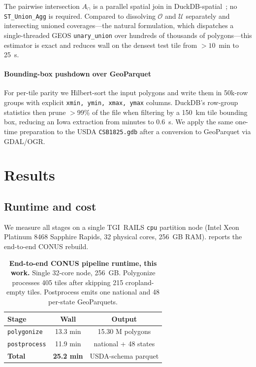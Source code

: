 \documentclass[preprint,12pt]{elsarticle}
\begin{document}
The pairwise intersection $A_\cap$ is a parallel spatial join in
DuckDB-spatial~\cite{duckdbspatial}; no \texttt{ST\_Union\_Agg} is
required. Compared to dissolving $\mathcal{O}$ and $\mathcal{U}$
separately and intersecting unioned coverages---the natural
formulation, which dispatches a single-threaded GEOS
\texttt{unary\_union} over hundreds of thousands of polygons---this
estimator is exact and reduces wall on the densest test tile from
$>10$~min to 25~s.

\paragraph{Bounding-box pushdown over GeoParquet}
For per-tile parity we Hilbert-sort the input polygons and write them
in 50k-row groups with explicit \texttt{xmin, ymin, xmax, ymax}
columns. DuckDB's row-group statistics then prune $>$99\% of the file
when filtering by a 150~km tile bounding box, reducing an Iowa
extraction from minutes to 0.6~s. We apply the same one-time
preparation to the USDA \texttt{CSB1825.gdb} after a conversion to
GeoParquet via GDAL/OGR.

\section{Results}
\label{sec:results}

\subsection{Runtime and cost}
\label{sec:results-runtime}

We measure all stages on a single TGI~RAILS \texttt{cpu} partition
node (Intel Xeon Platinum 8468 Sapphire Rapids, 32 physical cores,
256~GB RAM).  reports the end-to-end CONUS rebuild.

\begin{table}[t]
\centering
\caption{\textbf{End-to-end CONUS pipeline runtime, this work.}
Single 32-core node, 256~GB. Polygonize processes 405 tiles after
skipping 215 cropland-empty tiles. Postprocess emits one national and
48 per-state GeoParquets.}
\label{tab:runtime}
\small
\begin{tabular}{lcc}
\toprule
Stage & Wall & Output \\
\midrule
\texttt{polygonize}  & 13.3 min & 15.30 M polygons \\
\texttt{postprocess} & 11.9 min & national + 48 states \\
\midrule
\textbf{Total}       & \textbf{25.2 min} & USDA-schema parquet \\
\bottomrule
\end{tabular}
\end{table}
\end{document}
